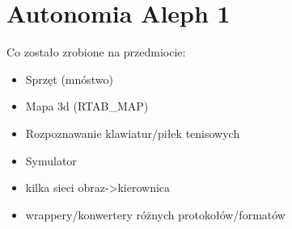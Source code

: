 \section{Autonomia Aleph 1}
Co zostało zrobione na przedmiocie:
\begin{itemize}
  \item Sprzęt (mnóstwo)
  \item Mapa 3d (RTAB\_MAP)
  \item Rozpoznawanie klawiatur/piłek tenisowych
  \item Symulator
  \item kilka sieci obraz->kierownica
  \item wrappery/konwertery różnych protokołów/formatów
\end{itemize}
